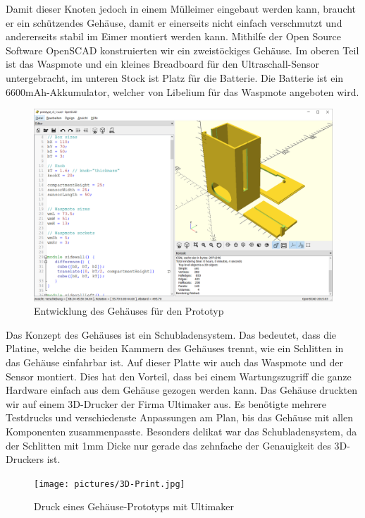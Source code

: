 Damit dieser Knoten jedoch in einem Mülleimer eingebaut werden kann, braucht er ein schützendes Gehäuse, damit er einerseits nicht einfach verschmutzt und andererseits stabil im Eimer montiert werden kann. Mithilfe der Open Source Software OpenSCAD konstruierten wir ein zweistöckiges Gehäuse. Im oberen Teil ist das Waspmote und ein kleines Breadboard für den Ultraschall-Sensor untergebracht, im unteren Stock ist Platz für die Batterie. Die Batterie ist ein 6600mAh-Akkumulator, welcher von Libelium für das Waspmote angeboten wird. 
 
\begin{figure}[H]
     \centering
        \includegraphics[width=1.0\textwidth]{pictures/OpenSCAD.png}
    \caption{Entwicklung des Gehäuses für den Prototyp}
    \label{fig:OpenSCAD}
\end{figure}

Das Konzept des Gehäuses ist ein Schubladensystem. Das bedeutet, dass die Platine, welche die beiden Kammern des Gehäuses trennt, wie ein Schlitten in das Gehäuse einfahrbar ist. Auf dieser Platte wir auch das Waspmote und der Sensor montiert. Dies hat den Vorteil, dass bei einem Wartungszugriff die ganze Hardware einfach aus dem Gehäuse gezogen werden kann.
Das Gehäuse druckten wir auf einem 3D-Drucker der Firma Ultimaker aus. Es benötigte mehrere Testdrucks und verschiedenste Anpassungen am Plan, bis das Gehäuse mit allen Komponenten zusammenpasste. Besonders delikat war das Schubladensystem, da der Schlitten mit 1mm Dicke nur gerade das zehnfache der Genauigkeit des 3D-Druckers ist.

\begin{figure}[H]
     \centering
        \texttt{[image: pictures/3D-Print.jpg]}
    \caption{Druck eines Gehäuse-Prototyps mit Ultimaker}
    \label{fig:3D-Print}
\end{figure}

